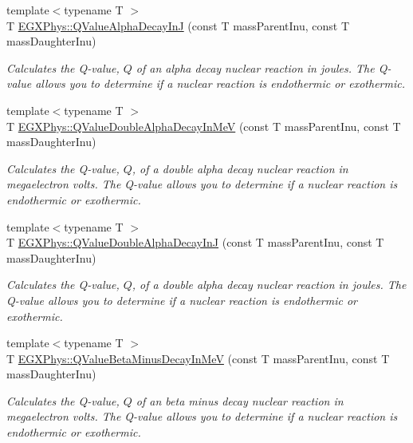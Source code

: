 \begin{DoxyCompactItemize}
{\footnotesize template$<$typename T $>$ }\\T \mbox{\hyperlink{group___e_g_x_phys-_q_value-_alpha_gab8a50c18f6de3c1b6ed280c26c3ff3a5}{E\+G\+X\+Phys\+::\+Q\+Value\+Alpha\+Decay\+InJ}} (const T mass\+Parent\+Inu, const T mass\+Daughter\+Inu)
\begin{DoxyCompactList}\small\item\em Calculates the Q-\/value, $Q$ of an alpha decay nuclear reaction in joules. The Q-\/value allows you to determine if a nuclear reaction is endothermic or exothermic. \end{DoxyCompactList}\item 
{\footnotesize template$<$typename T $>$ }\\T \mbox{\hyperlink{group___e_g_x_phys-_q_value-_alpha_ga85230c793adc7fc78fef760874f75ad9}{E\+G\+X\+Phys\+::\+Q\+Value\+Double\+Alpha\+Decay\+In\+MeV}} (const T mass\+Parent\+Inu, const T mass\+Daughter\+Inu)
\begin{DoxyCompactList}\small\item\em Calculates the Q-\/value, $Q$, of a double alpha decay nuclear reaction in megaelectron volts. The Q-\/value allows you to determine if a nuclear reaction is endothermic or exothermic. \end{DoxyCompactList}\item 
{\footnotesize template$<$typename T $>$ }\\T \mbox{\hyperlink{group___e_g_x_phys-_q_value-_alpha_ga015ade04346d0c6dae4dda8e3aab8cbd}{E\+G\+X\+Phys\+::\+Q\+Value\+Double\+Alpha\+Decay\+InJ}} (const T mass\+Parent\+Inu, const T mass\+Daughter\+Inu)
\begin{DoxyCompactList}\small\item\em Calculates the Q-\/value, $Q$, of a double alpha decay nuclear reaction in joules. The Q-\/value allows you to determine if a nuclear reaction is endothermic or exothermic. \end{DoxyCompactList}\item 
{\footnotesize template$<$typename T $>$ }\\T \mbox{\hyperlink{group___e_g_x_phys-_q_value-_beta_minus_gaac1374ce9ba39bef416f34298708bda9}{E\+G\+X\+Phys\+::\+Q\+Value\+Beta\+Minus\+Decay\+In\+MeV}} (const T mass\+Parent\+Inu, const T mass\+Daughter\+Inu)
\begin{DoxyCompactList}\small\item\em Calculates the Q-\/value, $Q$ of an beta minus decay nuclear reaction in megaelectron volts. The Q-\/value allows you to determine if a nuclear reaction is endothermic or exothermic. \end{DoxyCompactList}\item 

\end{DoxyCompactItemize}
